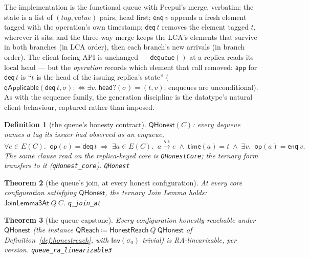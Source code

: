 \documentclass[11pt]{article}
\newtheorem{theorem}{Theorem}[section]
\newtheorem{definition}[theorem]{Definition}
\newcommand{\vis}{\xrightarrow{\mathsf{vis}}}
\newcommand{\Sinit}{\sigma_0}
\newcommand{\lean}[1]{\texttt{#1}}
\newcommand{\st}{\sigma}
\newcommand{\Inv}{\mathsf{Inv}}
\newcommand{\app}{\mathsf{app}}
\newcommand{\enq}{\mathsf{enq}}
\newcommand{\deq}{\mathsf{deq}}
\begin{document}
The implementation is the functional queue with Peepul's merge, verbatim:
the state is a list of $(\mathit{tag}, \mathit{value})$ pairs, head first;
$\mathsf{enq}\,v$ appends a fresh element tagged with the operation's own
timestamp; $\mathsf{deq}\,t$ removes the element tagged $t$, wherever it
sits; and the three-way merge keeps the LCA's elements that survive in both
branches (in LCA order), then each branch's new arrivals (in branch order).
The client-facing API is unchanged --- $\mathsf{dequeue}()$ at a replica
reads its local head --- but the \emph{operation} records which element that
call removed: $\app$ for $\mathsf{deq}\,t$ is ``$t$ is the head of the
issuing replica's state''
($\mathsf{qApplicable}(\deq\,t, \st) :\Leftrightarrow \exists v.\;
\mathsf{head?}(\st) = (t, v)$; enqueues are unconditional). As with the
sequence family, the generation discipline is the datatype's natural
client behaviour, captured rather than imposed.

\begin{definition}[the queue's honesty contract]
\label{def:qhonest}
$\mathsf{QHonest}(C)$: every dequeue names a tag its issuer had observed as an
enqueue,
\[
  \forall e \in E(C).\;\; \mathsf{op}(e) = \deq\,t \;\Longrightarrow\;
  \exists a \in E(C).\;\; a \vis e \;\wedge\; \mathsf{time}(a) = t
  \;\wedge\; \exists v.\;\; \mathsf{op}(a) = \enq\,v .
\]
The same clause read on the replica-keyed core is \lean{QHonestCore}; the ternary
form transfers to it (\lean{qHonest\_core}).
\hfill\lean{QHonest}
\end{definition}

\begin{theorem}[the queue's join, at every honest configuration]
\label{thm:qjoin}
At every core configuration satisfying $\mathsf{QHonest}$, the ternary Join Lemma
holds: $\mathsf{JoinLemma3At}\ Q\ C$.
\hfill\lean{q\_join\_at}
\end{theorem}

\begin{theorem}[the queue capstone]
\label{thm:queue}
Every configuration honestly reachable under $\mathsf{QHonest}$ (the
instance $\mathsf{QReach} \coloneqq \mathsf{HonestReach}\ Q\
\mathsf{QHonest}$ of Definition~\ref{def:honestreach}, with
$\Inv(\Sinit)$ trivial) is RA-linearizable, per version.
\hfill\lean{queue\_ra\_linearizable3}
\end{theorem}
\end{document}
